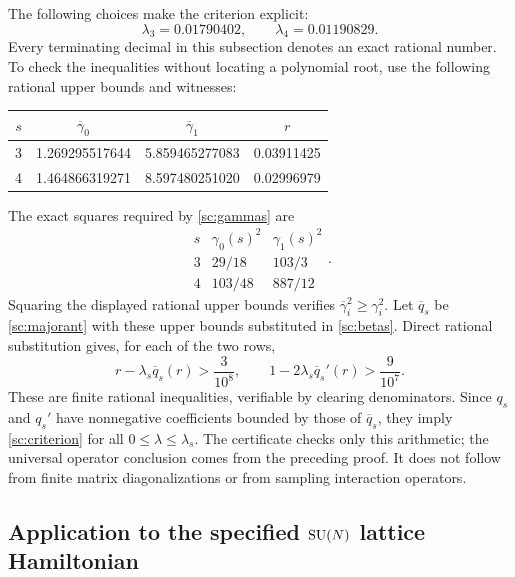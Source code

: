 The following choices make the criterion explicit:
\begin{equation}
 \lambda_3=0.01790402,\qquad \lambda_4=0.01190829.
 \label{sc:certified-lambdas}
\end{equation}
Every terminating decimal in this subsection denotes an exact rational
number. To check the inequalities without locating a polynomial root,
use the following rational upper bounds and witnesses:
\begin{center}
\begin{tabular}{c c c c}
$s$ & $\overline\gamma_0$ & $\overline\gamma_1$ & $r$\\
\hline
3 & 1.269295517644 & 5.859465277083 & 0.03911425\\
4 & 1.464866319271 & 8.597480251020 & 0.02996979
\end{tabular}
\end{center}
The exact squares required by \eqref{sc:gammas} are
\begin{equation}
 \begin{array}{c|cc}
 s&\gamma_0(s)^2&\gamma_1(s)^2\\ \hline
 3&29/18&103/3\\
 4&103/48&887/12
 \end{array}.
 \label{sc:exact-gamma-squares}
\end{equation}
Squaring the displayed rational upper bounds verifies
$\overline\gamma_i^2\ge\gamma_i^2$.
Let $\overline q_s$ be \eqref{sc:majorant} with these upper bounds
substituted in \eqref{sc:betas}. Direct rational substitution gives,
for each of the two rows,
\begin{equation}
 r-\lambda_s\overline q_s(r)>\frac{3}{10^8},
 \qquad
 1-2\lambda_s\overline q_s'(r)>\frac{9}{10^7}.
 \label{sc:rational-slacks}
\end{equation}
These are finite rational inequalities, verifiable by clearing
denominators. Since $q_s$ and $q_s'$ have nonnegative coefficients
bounded by those of $\overline q_s$, they imply
\eqref{sc:criterion} for all $0\le\lambda\le\lambda_s$.
The certificate checks only this arithmetic; the universal operator
conclusion comes from the preceding proof. It does not follow from
finite matrix diagonalizations or from sampling interaction operators.

\subsection{Application to the specified $\operatorname{SU}(N)$ lattice Hamiltonian}

